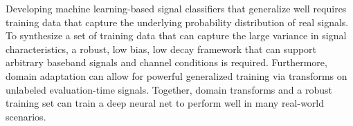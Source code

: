 Developing machine learning-based signal classifiers that generalize well requires training data that capture the underlying probability distribution of real signals. To synthesize a set of training data that can capture the large variance in signal characteristics, a robust, low bias, low decay framework that can support arbitrary baseband signals and channel conditions is required. Furthermore, domain adaptation can allow for powerful generalized training via transforms on unlabeled evaluation-time signals. Together, domain transforms and a robust training set can train a deep neural net to perform well in many real-world scenarios.